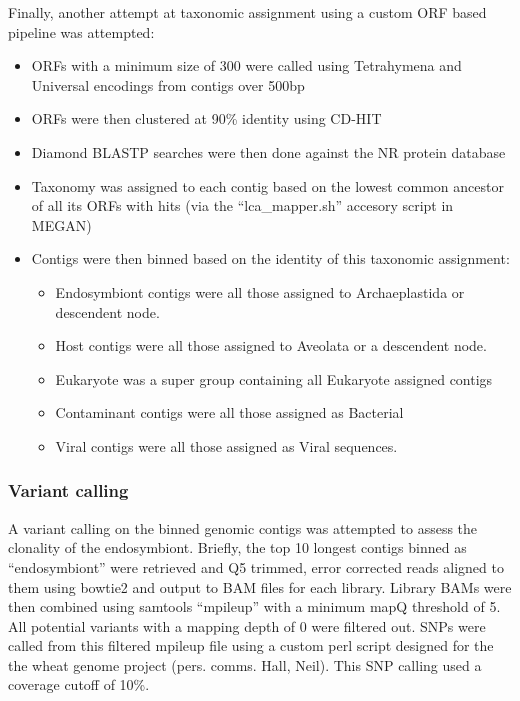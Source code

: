 Finally, another attempt at taxonomic assignment using a custom ORF based pipeline was attempted:
\begin{itemize}
    \item ORFs with a minimum size of 300 were called using Tetrahymena and Universal encodings from contigs over 500bp 
    \item ORFs were then clustered at 90\% identity using CD-HIT
    \item Diamond BLASTP searches were then done against the NR protein database
    \item Taxonomy was assigned to each contig based on the lowest common ancestor of all its
        ORFs with hits (via the ``lca\_mapper.sh'' accesory script in MEGAN)
    \item Contigs were then binned based on the identity of this taxonomic assignment:
        \begin{itemize}
            \item Endosymbiont contigs were all those assigned to Archaeplastida or descendent node.
            \item Host contigs were all those assigned to Aveolata or a descendent node.
            \item Eukaryote was a super group containing all Eukaryote assigned contigs
            \item Contaminant contigs were all those assigned as Bacterial
            \item Viral contigs were all those assigned as Viral sequences. 
        \end{itemize}
\end{itemize}

\subsubsection{Variant calling}

A variant calling on the binned genomic contigs was attempted 
to assess the clonality of the endosymbiont. 
Briefly, the top 10 longest contigs binned as ``endosymbiont'' 
were retrieved and Q5 trimmed, error corrected reads aligned
to them using bowtie2 and output to BAM files for each library.
Library BAMs were then combined using samtools ``mpileup''
with a minimum mapQ threshold of 5.  All potential variants
with a mapping depth of 0 were filtered out.
SNPs were called from this filtered mpileup file
using a custom perl script designed for the 
the wheat genome project (pers. comms. Hall, Neil).
This SNP calling used a coverage cutoff of 10\%.

